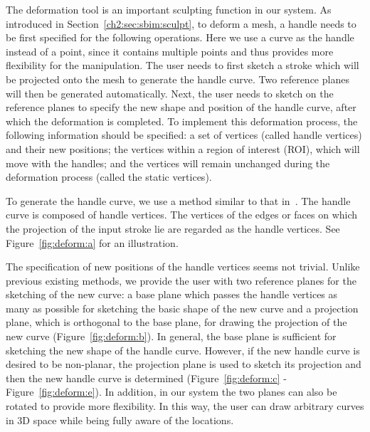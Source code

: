 The deformation tool is an important  sculpting function in our
system. As introduced in Section~\ref{ch2:sec:sbim:sculpt}, to
deform a mesh, a handle needs to be first specified for the
following operations. Here we use a curve as the handle instead of a
point, since it contains multiple points and thus provides more
flexibility for the manipulation. The user needs to first sketch a
stroke which will be projected onto the mesh to generate the handle
curve. Two reference planes will then be generated automatically.
Next, the user needs to sketch on the reference planes to specify
the new shape and position of the handle curve, after which the
deformation is completed. To implement this deformation process, the
following information should be specified: a set of vertices (called
handle vertices) and their new positions; the vertices within a
region of interest (ROI), which will move with the handles; and the
vertices will remain unchanged during the deformation process
(called the static vertices).

To generate the handle curve, we use a method similar to that
in~\cite{NSAC05}. The handle curve is composed of handle vertices.
The vertices of the edges or faces on which the projection of the
input stroke lie are regarded as the handle vertices. See
Figure~\ref{fig:deform:a} for an illustration.

The specification of new positions of the handle  vertices seems not
trivial. Unlike previous existing methods, we provide the user with
two reference planes for the sketching of the new curve: a base
plane which passes the handle vertices as many as possible for
sketching the basic shape of the new curve and a projection plane,
which is orthogonal to the base plane, for drawing the projection of
the new curve (Figure~\ref{fig:deform:b}). In general, the base
plane is sufficient for sketching the new shape of the handle curve.
However, if the new handle curve is desired to be non-planar, the
projection plane is used to sketch its projection and then the new
handle curve is determined (Figure~\ref{fig:deform:c} -
Figure~\ref{fig:deform:e}). In addition, in our system the two
planes can also be rotated to provide more flexibility. In this way,
the user can draw arbitrary curves in 3D space while being fully
aware of the locations.

